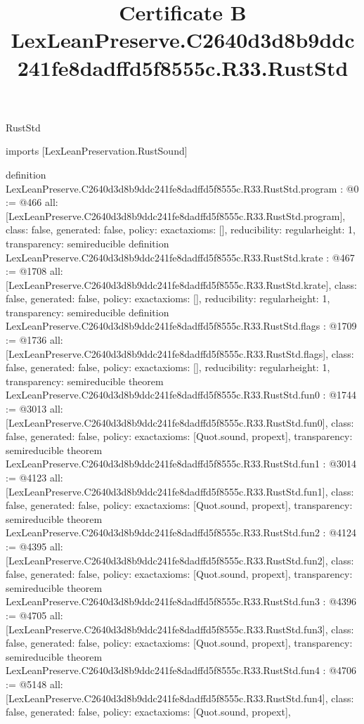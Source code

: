 \begin{lexlean}{RustStd}
\title{Certificate B LexLeanPreserve.C2640d3d8b9ddc241fe8dadffd5f8555c.R33.RustStd}
\begin{coremodule}
imports [LexLeanPreservation.RustSound]

definition LexLeanPreserve.C2640d3d8b9ddc241fe8dadffd5f8555c.R33.RustStd.program : @0 := @466 {
  all: [LexLeanPreserve.C2640d3d8b9ddc241fe8dadffd5f8555c.R33.RustStd.program],
  class: false,
  generated: false,
  policy: exact{axioms: []},
  reducibility: regular{height: 1},
  transparency: semireducible
}
definition LexLeanPreserve.C2640d3d8b9ddc241fe8dadffd5f8555c.R33.RustStd.krate : @467 := @1708 {
  all: [LexLeanPreserve.C2640d3d8b9ddc241fe8dadffd5f8555c.R33.RustStd.krate],
  class: false,
  generated: false,
  policy: exact{axioms: []},
  reducibility: regular{height: 1},
  transparency: semireducible
}
definition LexLeanPreserve.C2640d3d8b9ddc241fe8dadffd5f8555c.R33.RustStd.flags : @1709 := @1736 {
  all: [LexLeanPreserve.C2640d3d8b9ddc241fe8dadffd5f8555c.R33.RustStd.flags],
  class: false,
  generated: false,
  policy: exact{axioms: []},
  reducibility: regular{height: 1},
  transparency: semireducible
}
theorem LexLeanPreserve.C2640d3d8b9ddc241fe8dadffd5f8555c.R33.RustStd.fun0 : @1744 := @3013 {
  all: [LexLeanPreserve.C2640d3d8b9ddc241fe8dadffd5f8555c.R33.RustStd.fun0],
  class: false,
  generated: false,
  policy: exact{axioms: [Quot.sound, propext]},
  transparency: semireducible
}
theorem LexLeanPreserve.C2640d3d8b9ddc241fe8dadffd5f8555c.R33.RustStd.fun1 : @3014 := @4123 {
  all: [LexLeanPreserve.C2640d3d8b9ddc241fe8dadffd5f8555c.R33.RustStd.fun1],
  class: false,
  generated: false,
  policy: exact{axioms: [Quot.sound, propext]},
  transparency: semireducible
}
theorem LexLeanPreserve.C2640d3d8b9ddc241fe8dadffd5f8555c.R33.RustStd.fun2 : @4124 := @4395 {
  all: [LexLeanPreserve.C2640d3d8b9ddc241fe8dadffd5f8555c.R33.RustStd.fun2],
  class: false,
  generated: false,
  policy: exact{axioms: [Quot.sound, propext]},
  transparency: semireducible
}
theorem LexLeanPreserve.C2640d3d8b9ddc241fe8dadffd5f8555c.R33.RustStd.fun3 : @4396 := @4705 {
  all: [LexLeanPreserve.C2640d3d8b9ddc241fe8dadffd5f8555c.R33.RustStd.fun3],
  class: false,
  generated: false,
  policy: exact{axioms: [Quot.sound, propext]},
  transparency: semireducible
}
theorem LexLeanPreserve.C2640d3d8b9ddc241fe8dadffd5f8555c.R33.RustStd.fun4 : @4706 := @5148 {
  all: [LexLeanPreserve.C2640d3d8b9ddc241fe8dadffd5f8555c.R33.RustStd.fun4],
  class: false,
  generated: false,
  policy: exact{axioms: [Quot.sound, propext]},
}
\end{coremodule}
\end{lexlean}
